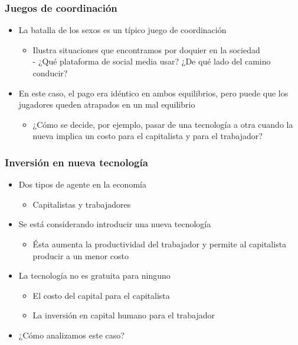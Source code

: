 \documentclass{beamer}
\begin{document}
\begin{frame}
\frametitle{Juegos de coordinación}
\begin{itemize}
        \item La batalla de los sexos es un típico juego de coordinación
        \begin{itemize}
            \item Ilustra situaciones que encontramos por doquier en la sociedad \\
            - ¿Qué plataforma de social media usar? ¿De qué lado del camino conducir?
        \end{itemize}
        \item En este caso, el pago era idéntico en ambos equilibrios, pero puede que los jugadores queden atrapados en un mal equilibrio
        \begin{itemize}
            \item ¿Cómo se decide, por ejemplo, pasar de una tecnología a otra cuando la nueva implica un costo para el capitalista y para el trabajador?
        \end{itemize}
\end{itemize}
\end{frame}

\begin{frame}
\frametitle{Inversión en nueva tecnología}
\begin{itemize}
        \item Dos tipos de agente en la economía
        \begin{itemize}
            \item Capitalistas y trabajadores
        \end{itemize}
        \item Se está considerando introducir una nueva tecnología
        \begin{itemize}
            \item Ésta aumenta la productividad del trabajador y permite al capitalista producir a un menor costo
        \end{itemize}
        \item La tecnología no es gratuita para ninguno
        \begin{itemize}
            \item El costo del capital para el capitalista
            \item La inversión en capital humano para el trabajador
        \end{itemize}
        \item ¿Cómo analizamos este caso?
\end{itemize}
\end{frame}
\end{document}
